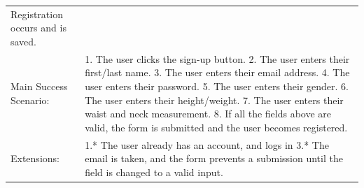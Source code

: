 \documentclass[10pt]{article}
\begin{document}
\begin{longtable}[]{@{}ll@{}}
\begin{minipage}[t]{0.47\columnwidth}
Registration occurs and is saved.\strut
\end{minipage}\tabularnewline
\begin{minipage}[t]{0.48\columnwidth}\raggedright\strut
Main Success Scenario:\strut
\end{minipage} & \begin{minipage}[t]{0.48\columnwidth}\raggedright\strut
1. The user clicks the sign-up button.
2. The user enters their first/last name.
3. The user enters their email address.
4. The user enters their password.
5. The user enters their gender.
6. The user enters their height/weight.
7. The user enters their waist and neck measurement.
8. If all the fields above are valid, the form is submitted and the user becomes registered.
\strut
\end{minipage}\tabularnewline
\begin{minipage}[t]{0.48\columnwidth}\raggedright\strut
Extensions:\strut
\end{minipage} & \begin{minipage}[t]{0.48\columnwidth}\raggedright\strut
1.* The user already has an account, and logs in
3.* The email is taken, and the form prevents a submission until the field is changed to a valid input.
\strut
\end{minipage}\tabularnewline
\bottomrule
\end{longtable}
\end{document}
